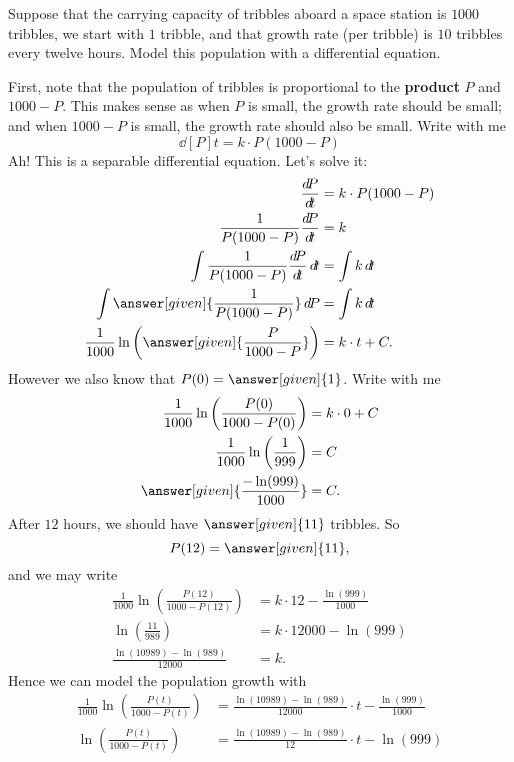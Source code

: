 \documentclass{ximera}
\begin{document}
\begin{example}
Suppose that the carrying capacity of tribbles aboard a space station
is $1000$ tribbles, we start with $1$ tribble, and that growth rate
(per tribble) is $10$ tribbles every twelve hours. Model this
population with a differential equation.
\begin{explanation}
  First, note that the population of tribbles is proportional to the
  \textbf{product} $P$ and $1000-P$. This makes sense as when $P$ is
  small, the growth rate should be small; and when $1000-P$ is small,
  the growth rate should also be small. Write with me
  \[
  \dd[P]{t}  = k \cdot P (1000-P)
  \]
  Ah! This is a separable differential equation. Let's solve it:
  \begin{align*}
    \dd[P]{t}  &= k \cdot P (1000-P)\\
    \frac{1}{P (1000-P)}\dd[P]{t}  &= k \\
    \int \frac{1}{P (1000-P)}\dd[P]{t}\d t  &= \int k\d t \\
    \int \answer[given]{\frac{1}{P (1000-P)}} \d P  &= \int k\d t \\
    \frac{1}{1000}\ln\left(\answer[given]{\frac{P}{1000-P}}\right)  &= k\cdot t + C.
  \end{align*}
  However we also know that $P(0) = \answer[given]{1}$. Write with me
  \begin{align*}
      \frac{1}{1000}\ln\left(\frac{P(0)}{1000-P(0)}\right)  &= k\cdot 0 + C\\
      \frac{1}{1000}\ln\left(\frac{1}{999}\right)  &= C\\
      \answer[given]{\frac{-\ln(999)}{1000}}  &= C.
  \end{align*}
  After $12$ hours, we should have $\answer[given]{11}$ tribbles. So 
  \[
  P(12) = \answer[given]{11},
  \]
  and we may write
  \begin{align*}
    \frac{1}{1000}\ln\left(\frac{P(12)}{1000-P(12)}\right) &= k\cdot 12-\frac{\ln(999)}{1000}\\
    \ln\left(\frac{11}{989}\right) &= k\cdot 12000-\ln(999) \\
    \frac{\ln(10989)-\ln(989)}{12000} &= k.
  \end{align*}
  Hence we can model the population growth with
  \begin{align*}
    \frac{1}{1000}\ln\left(\frac{P(t)}{1000-P(t)}\right)  &= \frac{\ln(10989)-\ln(989)}{12000}\cdot t - \frac{\ln(999)}{1000}\\
    \ln\left(\frac{P(t)}{1000-P(t)}\right)  &= \frac{\ln(10989)-\ln(989)}{12}\cdot t - \ln(999)\\

\end{align*}
\end{explanation}
\end{example}
\end{document}
